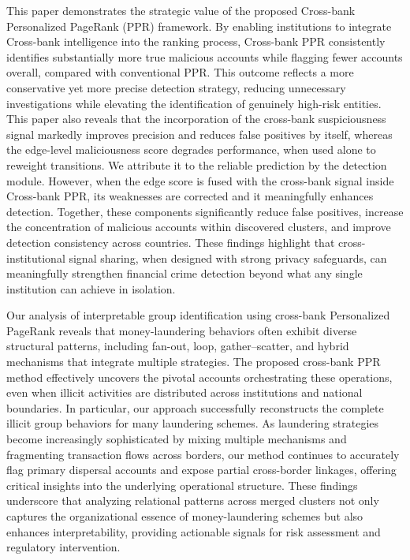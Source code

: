 \documentclass[11pt,english]{article}
\begin{document}
This paper demonstrates the strategic value of the proposed Cross-bank Personalized PageRank (PPR) framework. By enabling institutions to integrate Cross-bank intelligence into the ranking process, Cross-bank PPR consistently identifies substantially more true malicious accounts while flagging fewer accounts overall, compared with conventional PPR. This outcome reflects a more conservative yet more precise detection strategy, reducing unnecessary investigations while elevating the identification of genuinely high-risk entities. This paper also reveals that the incorporation of the cross-bank suspiciousness signal markedly improves precision and reduces false positives by itself, whereas the edge-level maliciousness score degrades performance, when used alone to reweight transitions. We attribute it to the reliable prediction by the detection module. However, when the edge score is fused with the cross-bank signal inside Cross-bank PPR, its weaknesses are corrected and it meaningfully enhances detection. Together, these components significantly reduce false positives, increase the concentration of malicious accounts within discovered clusters, and improve detection consistency across countries. These findings highlight that cross-institutional signal sharing, when designed with strong privacy safeguards, can meaningfully strengthen financial crime detection beyond what any single institution can achieve in isolation.

Our analysis of interpretable group identification using cross-bank Personalized PageRank reveals that money-laundering behaviors often exhibit diverse structural patterns, including fan-out, loop, gather–scatter, and hybrid mechanisms that integrate multiple strategies. The proposed cross-bank PPR method effectively uncovers the pivotal accounts orchestrating these operations, even when illicit activities are distributed across institutions and national boundaries. In particular, our approach successfully reconstructs the complete illicit group behaviors for many laundering schemes. As laundering strategies become increasingly sophisticated by mixing multiple mechanisms and fragmenting transaction flows across borders, our method continues to accurately flag primary dispersal accounts and expose partial cross-border linkages, offering critical insights into the underlying operational structure. These findings underscore that analyzing relational patterns across merged clusters not only captures the organizational essence of money-laundering schemes but also enhances interpretability, providing actionable signals for risk assessment and regulatory intervention.
\end{document}
